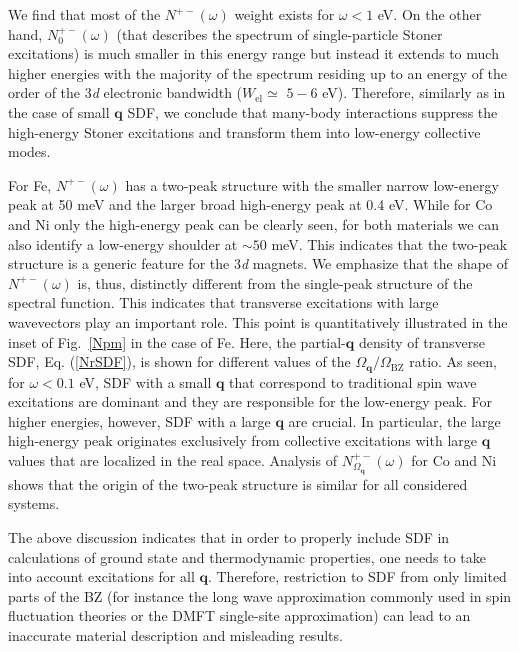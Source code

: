 We find that most of the $N^{+-}(\omega)$ weight exists for $\omega < 1$ eV. On the other hand, $N^{+-}_0(\omega)$ (that describes the spectrum of single-particle Stoner excitations) is much smaller in this energy range but instead it extends to much higher energies with the majority of the spectrum residing up to an energy of the order of the 3\emph{d} electronic bandwidth ($W_{\text{el}} \simeq$ $5-6$ eV). Therefore, similarly as in the case of small $\mathbf{q}$ SDF, we conclude that many-body interactions suppress the high-energy Stoner excitations and transform them into low-energy collective modes.

For Fe, $N^{+-}(\omega)$ has a two-peak structure with the smaller narrow low-energy peak at 50 meV and the larger broad high-energy peak at 0.4 eV. While for Co and Ni only the high-energy peak can be clearly seen, for both materials we can also identify a low-energy shoulder at $\sim 50$ meV. This indicates that the two-peak structure is a generic feature for the 3\emph{d} magnets. We emphasize that the shape of $N^{+-}(\omega)$ is, thus, distinctly different from the single-peak structure of the spectral function. This indicates that transverse excitations with large wavevectors play an important role. This point is quantitatively illustrated in the inset of Fig.~\ref{Npm} in the case of Fe. Here, the partial-$\mathbf{q}$ density of transverse SDF, Eq. (\ref{NrSDF}), is shown for different values of the $\Omega_{\mathbf{q}}/\Omega_{\text{BZ}}$ ratio. As seen, for $\omega < 0.1$ eV, SDF with a small $\mathbf{q}$ that correspond to traditional spin wave excitations are dominant and they are responsible for the low-energy peak. For higher energies, however, SDF with a large $\mathbf{q}$ are crucial. In particular, the large high-energy peak originates exclusively from collective excitations with large $\mathbf{q}$ values that are localized in the real space. Analysis of $N_{\Omega_\mathbf{q}}^{+-}(\omega)$ for Co and Ni shows that the origin of the two-peak structure is similar for all considered systems.

The above discussion indicates that in order to properly include SDF in calculations of ground state and thermodynamic properties, one needs to take into account excitations for all $\mathbf{q}$. Therefore, restriction to SDF from only limited parts of the BZ (for instance the long wave approximation commonly used in spin fluctuation theories or the DMFT single-site approximation) can lead to an inaccurate material description and misleading results.
\FloatBarrier


